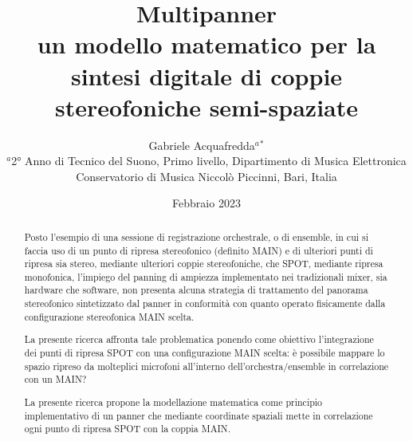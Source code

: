 \documentclass{article}
\title{Multipanner \\ un modello matematico per la sintesi digitale di coppie stereofoniche semi-spaziate}
\author{Gabriele Acquafredda$^{a}$$^{*}$ \\
    \small $^{a}$2° Anno di Tecnico del Suono, Primo livello, Dipartimento di Musica Elettronica\\
    \small  Conservatorio di Musica Niccolò Piccinni, Bari, Italia\\
}
\date{Febbraio 2023}
\begin{document}
\maketitle

\begin{abstract} 
    \noindent Posto l'esempio di una sessione di registrazione orchestrale, o di ensemble, in cui si faccia uso di un punto di ripresa stereofonico (definito MAIN) e di ulteriori punti di ripresa sia stereo, mediante ulteriori coppie stereofoniche, che SPOT, mediante ripresa monofonica, l'impiego del panning di ampiezza implementato nei tradizionali mixer, sia hardware che software, non presenta alcuna strategia di trattamento del panorama stereofonico sintetizzato dal panner in conformità con quanto operato fisicamente dalla configurazione stereofonica MAIN scelta.

La presente ricerca affronta tale problematica ponendo come obiettivo l'integrazione dei punti di ripresa SPOT con una configurazione MAIN scelta: è possibile mappare lo spazio ripreso da molteplici microfoni all'interno dell'orchestra/ensemble in correlazione con un MAIN?



La presente ricerca propone la modellazione matematica come principio implementativo di un panner che mediante coordinate spaziali mette in correlazione ogni punto di ripresa SPOT con la coppia MAIN.
\end{abstract}

\end{document}
